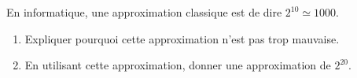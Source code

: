 
\begin{exercice}\label{exo2smath-0201}

En informatique, une approximation classique est de dire \( 2^10 \simeq 1000\).
\begin{enumerate}
    \item
        Expliquer pourquoi cette approximation n'est pas trop mauvaise.
    \item
        En utilisant cette approximation, donner une approximation de \( 2^20\).
\end{enumerate}

\end{exercice}
